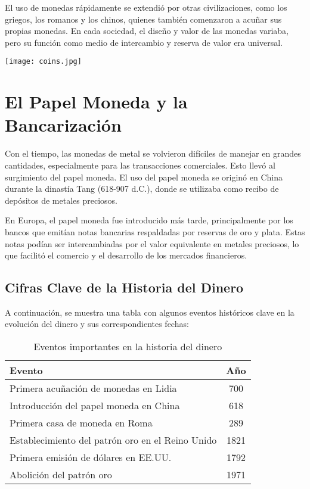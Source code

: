 	El uso de monedas rápidamente se extendió por otras civilizaciones, como los griegos, los romanos y los chinos, quienes también comenzaron a acuñar sus propias monedas. En cada sociedad, el diseño y valor de las monedas variaba, pero su función como medio de intercambio y reserva de valor era universal.

	\begin{mdframed}[backgroundcolor=gray!10,linewidth=2pt]
		\centering
		\texttt{[image: coins.jpg]}
	\end{mdframed}

	\section{El Papel Moneda y la Bancarización}

	Con el tiempo, las monedas de metal se volvieron difíciles de manejar en grandes cantidades, especialmente para las transacciones comerciales. Esto llevó al surgimiento del papel moneda. El uso del papel moneda se originó en China durante la dinastía Tang (618-907 d.C.), donde se utilizaba como recibo de depósitos de metales preciosos.

	En Europa, el papel moneda fue introducido más tarde, principalmente por los bancos que emitían notas bancarias respaldadas por reservas de oro y plata. Estas notas podían ser intercambiadas por el valor equivalente en metales preciosos, lo que facilitó el comercio y el desarrollo de los mercados financieros.

	\subsection{Cifras Clave de la Historia del Dinero}

	A continuación, se muestra una tabla con algunos eventos históricos clave en la evolución del dinero y sus correspondientes fechas:

	\begin{table}[h!]
		\centering
		\begin{tabular}{@{}l S[table-format=4.0]@{}}
			\toprule
			\textbf{Evento} & \textbf{Año} \\
			\midrule
			Primera acuñación de monedas en Lidia & 700 \\
			Introducción del papel moneda en China & 618 \\
			Primera casa de moneda en Roma & 289 \\
			Establecimiento del patrón oro en el Reino Unido & 1821 \\
			Primera emisión de dólares en EE.UU. & 1792 \\
			Abolición del patrón oro & 1971 \\
			\bottomrule
		\end{tabular}
		\caption{Eventos importantes en la historia del dinero}
		\label{tab:moneyhistory}
	\end{table}

